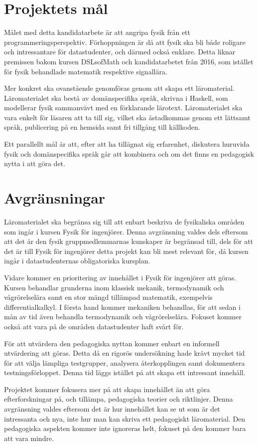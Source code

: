 \section{Projektets mål}

Målet med detta kandidatarbete är att angripa fysik från ett
programmeringsperspektiv. Förhoppningen är då att fysik ska bli både
roligare och intressantare för datastudenter, och därmed också
enklare. Detta liknar premissen bakom kursen DSLsofMath och kandidatarbetet
från 2016, som istället för fysik behandlade matematik respektive signallära.

Mer konkret ska ovanstående genomföras genom att skapa ett läromaterial.
Läromaterialet ska bestå av
domänspecifika språk, skrivna
i Haskell, som
modellerar fysik sammanvävt med en förklarande lärotext. Läromaterialet ska vara
enkelt för läsaren att ta till sig, vilket ska åstadkommas genom ett lättsamt
språk, publicering på en hemsida samt fri tillgång till källkoden.

Ett parallellt mål är att, efter att ha tillägnat sig erfarenhet, diskutera
huruvida fysik och domänspecifika språk går att kombinera och om det finns en
pedagogisk nytta i att göra det.

\section{Avgränsningar}\label{sec:avgransningar}

Läromaterialet ska begränsa sig till att enbart beskriva de fysikaliska områden
som ingår i kursen Fysik för ingenjörer. Denna avgränsning valdes dels eftersom
att det är den fysik gruppmedlemmarnas kunskaper är begränsad till, dels för att
det är till Fysik för ingenjörer detta projekt kan bli mest relevant för, då
kursen ingår i datastudenternas obligatoriska kursplan.

Vidare kommer en prioritering av innehållet i Fysik för ingenjörer att göras.
Kursen behandlar grunderna inom klassisk mekanik, termodynamik och
vågrörelselära samt en stor mängd tillämpad matematik, exempelvis
differentialkalkyl. I första hand kommer mekaniken behandlas, för att sedan i mån
av tid även behandla termodynamik och vågrörelselära. Fokuset kommer också att
vara på de områden datastudenter haft svårt för.

För att utvärdera den pedagogiska nyttan kommer enbart en informell utvärdering
att göras. Detta då en rigorös undersökning hade krävt mycket tid för att välja
lämpliga testgrupper, analysera återkopplingen samt dokumentera
testningsförloppet. Denna tid läggs istället på att skapa ett intressant innehåll.

Projektet kommer fokusera mer på att skapa innehållet än att göra
efterforskningar på, och tillämpa, pedagogiska teorier och riktlinjer. Denna
avgränsning valdes eftersom det är hur innehållet kan se ut som är det
intressanta och nya, inte hur man kan skriva ett pedagogiskt läromaterial. Den
pedagogiska aspekten kommer inte ignoreras helt, fokuset på den kommer bara att
vara mindre.

